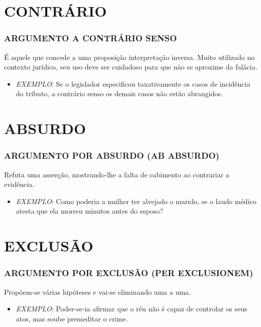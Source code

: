 \documentclass[aspectratio=1610]{beamer}
\begin{document}
\section {CONTRÁRIO}
\begin{frame}
  \frametitle{ARGUMENTO A CONTRÁRIO SENSO}
\begin{center}
  É aquele que concede a uma proposição interpretação inversa. Muito utilizado no contexto jurídico, seu uso deve ser cuidadoso para que não se aproxime da falácia.
 \end{center}

\begin{itemize}
  \item \textit{EXEMPLO}:  Se o legislador especificou taxativamente os casos de incidência do tributo, a contrário senso os demais casos não estão abrangidos.
\end{itemize}
\end{frame}

\section {ABSURDO}
\begin{frame}
  \frametitle{ARGUMENTO POR ABSURDO (AB ABSURDO)    }

\begin{center}
Refuta uma asserção, mostrando-lhe a falta de cabimento ao contrariar a evidência.
\end{center}

\begin{itemize}
  \item \textit{EXEMPLO}: Como poderia a mulher ter alvejado o marido, se o laudo médico atesta que ela morreu minutos antes do esposo?
\end{itemize}
\end{frame}

\section {EXCLUSÃO}
\begin{frame}
  \frametitle{ARGUMENTO POR EXCLUSÃO (PER EXCLUSIONEM)   }
\begin{center}
Propõem-se várias hipóteses e vai-se eliminando uma a uma.
\end{center}

\begin{itemize}
  \item \textit{EXEMPLO}: Poder-se-ia afirmar que o réu não é capaz de controlar os seus atos, mas soube premeditar o crime.
\end{itemize}
\end{frame}
\end{document}
